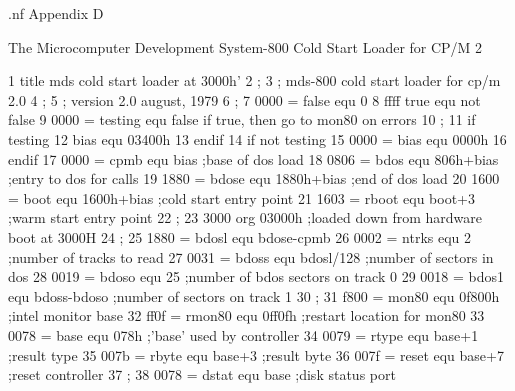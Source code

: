 .nf
                                             Appendix D

                              The Microcomputer Development System-800 Cold Start Loader for CP/M 2



  1                                title   mds cold start loader at 3000h'
  2                       ;
  3                       ;        mds-800 cold start loader for cp/m 2.0
  4                       ;
  5                       ;        version 2.0 august, 1979
  6                       ;
  7      0000 =           false    equ     0
  8      ffff             true     equ     not false
  9      0000 =           testing  equ     false    if true, then go to mon80 on errors
 10                       ;
 11                                if      testing
 12                       bias     equ     03400h
 13                                endif
 14                                if      not testing
 15      0000 =           bias     equ     0000h
 16                                endif
 17      0000 =           cpmb     equ     bias          ;base of dos load
 18      0806 =           bdos     equ     806h+bias     ;entry to dos for calls
 19      1880 =           bdose    equ     1880h+bias    ;end of dos load
 20      1600 =           boot     equ     1600h+bias    ;cold start entry point
 21      1603 =           rboot    equ     boot+3        ;warm start entry point
 22                       ;
 23      3000                      org     03000h        ;loaded down from hardware boot at 3000H
 24                       ;
 25      1880 =           bdosl    equ     bdose-cpmb
 26      0002 =           ntrks    equ     2             ;number of tracks to read
 27      0031 =           bdoss    equ     bdosl/128     ;number of sectors in dos
 28      0019 =           bdoso    equ     25            ;number of bdos sectors on track 0
 29      0018 =           bdos1    equ     bdoss-bdoso   ;number of sectors on track 1
 30                       ;
 31      f800 =           mon80    equ     0f800h        ;intel monitor base
 32      ff0f =           rmon80   equ     0ff0fh        ;restart location for mon80
 33      0078 =           base     equ     078h          ;'base' used by controller
 34      0079 =           rtype    equ     base+1        ;result type
 35      007b =           rbyte    equ     base+3        ;result byte
 36      007f =           reset    equ     base+7        ;reset controller
 37                       ;
 38      0078 =           dstat    equ     base          ;disk status port
